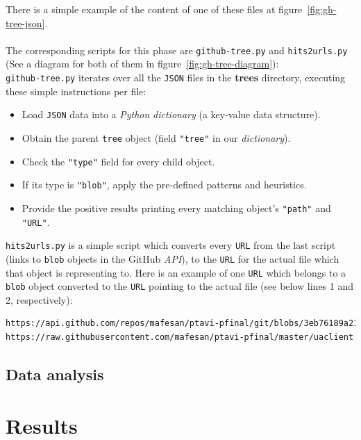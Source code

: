 \documentclass[a4paper, 12pt]{book}
\begin{document}
There is a simple example of the content of one of these files at figure~\ref{fig:gh-tree-json}.\\\\
The corresponding scripts for this phase are \texttt{github-tree.py} and \texttt{hits2urls.py}
(See a diagram for both of them in figure~\ref{fig:gh-tree-diagram}):\\
\texttt{github-tree.py} iterates over all the \texttt{JSON} files in the \textbf{trees} directory,
executing these simple instructions per file:
\begin{itemize}
  \item Load \texttt{JSON} data into a \emph{Python} \textit{dictionary} (a key-value data structure).
  \item Obtain the parent \texttt{tree} object (field \texttt{"tree"} in our \textit{dictionary}).
  \item Check the \texttt{"type"} field for every child object.
  \item If its type is \texttt{"blob"}, apply the pre-defined patterns and heuristics.
  \item Provide the positive results printing every matching object's \texttt{"path"} and \texttt{"URL"}.
\end{itemize}
\texttt{hits2urls.py} is a simple script which converts every \texttt{URL} from the last script (links to \texttt{blob} objects
in the GitHub \textit{API}), to the \texttt{URL} for the actual file which that object is representing to.
Here is an example of one \texttt{URL} which belongs to a \texttt{blob} object converted to the \texttt{URL}
pointing to the actual file (see below lines 1 and 2, respectively):
\begin{lstlisting}[language=bash]
https://api.github.com/repos/mafesan/ptavi-pfinal/git/blobs/3eb76189a21a...
https://raw.githubusercontent.com/mafesan/ptavi-pfinal/master/uaclient.py \end{lstlisting}
\section{Data analysis}
\label{sec:data-analysis}
\cleardoublepage
\chapter{Results}
\end{document}
